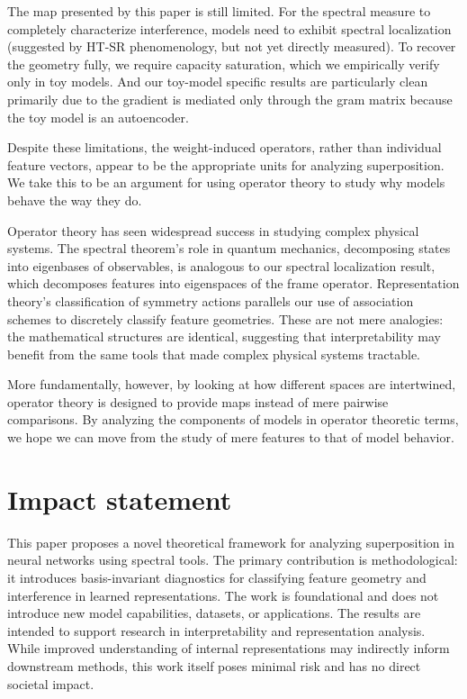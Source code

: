 \documentclass{article}
\theoremstyle{plain}
\numberwithin{equation}{section}
\theoremstyle{definition}
\theoremstyle{remark}
\begin{document}
The map presented by this paper is still limited. For the spectral measure to completely characterize interference, models need to exhibit spectral localization (suggested by HT-SR phenomenology, but not yet directly measured). To recover the geometry fully, we require capacity saturation, which we empirically verify only in toy models. And our toy-model specific results are particularly clean primarily due to the gradient is mediated only through the gram matrix because the toy model is an autoencoder.

Despite these limitations, the weight-induced operators, rather than individual feature vectors, appear to be the appropriate units for analyzing superposition. We take this to be an argument for using operator theory to study why models behave the way they do.

Operator theory has seen widespread success in studying complex physical systems. The spectral theorem's role in quantum mechanics, decomposing states into eigenbases of observables, is analogous to our spectral localization result, which decomposes features into eigenspaces of the frame operator. Representation theory's classification of symmetry actions parallels our use of association schemes to discretely classify feature geometries. These are not mere analogies: the mathematical structures are identical, suggesting that interpretability may benefit from the same tools that made complex physical systems tractable.

More fundamentally, however, by looking at how different spaces are intertwined, operator theory is designed to provide maps instead of mere pairwise comparisons. By analyzing the components of models in operator theoretic terms, we hope we can move from the study of mere features to that of model behavior.

\section{Impact statement}
This paper proposes a novel theoretical framework for analyzing superposition in neural networks using spectral tools. The primary contribution is methodological: it introduces basis-invariant diagnostics for classifying feature geometry and interference in learned representations. The work is foundational and does not introduce new model capabilities, datasets, or applications. The results are intended to support research in interpretability and representation analysis. While improved understanding of internal representations may indirectly inform downstream methods, this work itself poses minimal risk and has no direct societal impact.
\end{document}
